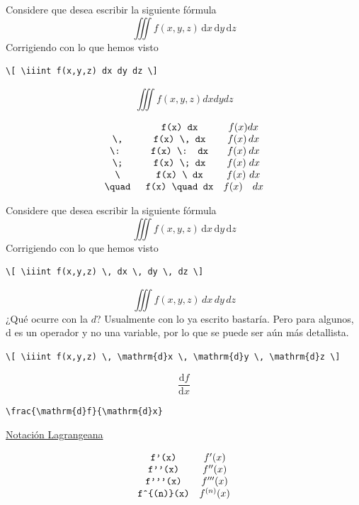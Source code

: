 \documentclass[../notes.tex]{subfiles}
\begin{document}
        Considere que desea escribir la siguiente fórmula
            \[ \iiint f(x,y,z) \, \mathrm{d}x \, \mathrm{d}y \, \mathrm{d}z \]
        Corrigiendo con lo que hemos visto
            \begin{verbatim}
\[ \iiint f(x,y,z) dx dy dz \]
            \end{verbatim}
\[ \iiint f(x,y,z) dx dy dz \]

    
        {\Large\[
        	\begin{array}{ccc}
                \text{} & \text{\texttt{f(x) dx}} & f(x) dx\\
                \text{\texttt{\textbackslash, }} & \text{\texttt{f(x) \textbackslash, dx}} & f(x) \, dx\\
                \text{\texttt{\textbackslash: }} & \text{\texttt{f(x) \textbackslash: dx}} & f(x) \: dx\\
                \text{\texttt{\textbackslash; }} & \text{\texttt{f(x) \textbackslash; dx}} & f(x) \; dx\\
                \text{\texttt{\textbackslash{}  }} & \text{\texttt{f(x) \textbackslash{}  dx}} & f(x) \ dx\\
                \text{\texttt{\textbackslash{}quad }} & \text{\texttt{f(x) \textbackslash quad dx}} & f(x) \quad dx
        	\end{array}
        \]}

        Considere que desea escribir la siguiente fórmula
            \[ \iiint f(x,y,z) \, \text{d}x \, \text{d}y \, \text{d}z \]
        Corrigiendo con lo que hemos visto
            \begin{verbatim}
\[ \iiint f(x,y,z) \, dx \, dy \, dz \]
            \end{verbatim}
\[ \iiint f(x,y,z) \, dx \, dy \, dz \]
        	¿Qué ocurre con la $d$? Usualmente con lo ya escrito bastaría. Pero para algunos, d es un operador y no una variable, por lo que se puede ser aún más detallista.
        {\footnotesize
            \begin{verbatim}
\[ \iiint f(x,y,z) \, \mathrm{d}x \, \mathrm{d}y \, \mathrm{d}z \]
            \end{verbatim}
        }
        
        	\[ \frac{\text{d}f}{\text{d}x} \]
\begin{verbatim}
\frac{\mathrm{d}f}{\mathrm{d}x}
\end{verbatim}
        	\underline{Notación Lagrangeana}
        	
        	\[   
        		\begin{array}{cc}      
        			\text{\texttt{f'(x)}} & f'(x)\\
        			\text{\texttt{f'}\texttt{'(x)}} & f''(x)\\
        			\text{\texttt{f'}\texttt{'}\texttt{'(x)}} & f'''(x)\\
        			\text{\texttt{f\^{}\{(n)\}(x)}} & f^{(n)}(x)\\
        		\end{array}
        	\]
\end{document}
